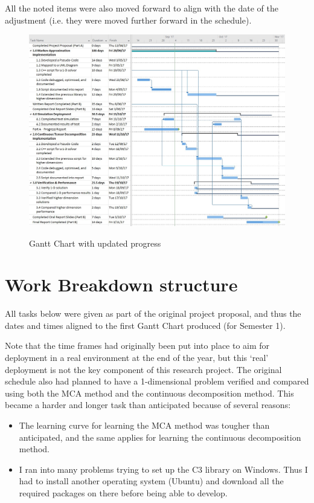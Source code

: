 \documentclass[11pt,draftd]{article}
\begin{document}
\begin{appendices}
	All the noted items were also moved forward to align with the date of the adjustment (i.e. they were moved further forward in the schedule).
	\[\]
	\begin{figure}[h!]
		\centering
		\includegraphics[scale=0.54]{images/UpdatedGanttProgressSem2}
		\label{UpdatedGanttProgress}
		\caption{Gantt Chart with updated progress}
	\end{figure}

\newpage

	\section{Work Breakdown structure}\label{app_itemB}
	All tasks below were given as part of the original project proposal, and thus the dates and times aligned to the first Gantt Chart produced (for Semester 1).
	
	Note that the time frames had originally been put into place to aim for deployment in a real environment at the end of the year, but this ‘real’ deployment is not the key component of this research project. The original schedule also had planned to have a 1-dimensional problem verified and compared using both the MCA method and the continuous decomposition method. This became a harder and longer task than anticipated because of several reasons: \\
	\begin{itemize}
		\item The learning curve for learning the MCA method was tougher than anticipated, and the same applies for learning the continuous decomposition method.
		\item I ran into many problems trying to set up the C3 library on Windows. Thus I had to install another operating system (Ubuntu) and download all the required packages on there before being able to develop. \\
	\end{itemize}
	

\end{appendices}
\end{document}
